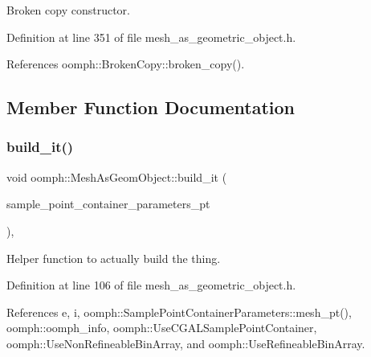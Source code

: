 Broken copy constructor. 



Definition at line 351 of file mesh\+\_\+as\+\_\+geometric\+\_\+object.\+h.



References oomph\+::\+Broken\+Copy\+::broken\+\_\+copy().



\subsection{Member Function Documentation}
\mbox{\label{classoomph_1_1MeshAsGeomObject_a1d0d14e9a1acf2b865df676fd354444f}} 
\subsubsection{\texorpdfstring{build\+\_\+it()}{build\_it()}}
{\footnotesize\ttfamily void oomph\+::\+Mesh\+As\+Geom\+Object\+::build\+\_\+it (\begin{DoxyParamCaption}\item[{\hyperlink{classoomph_1_1SamplePointContainerParameters}{Sample\+Point\+Container\+Parameters} $\ast$}]{sample\+\_\+point\+\_\+container\+\_\+parameters\+\_\+pt }\end{DoxyParamCaption})\hspace{0.3cm}{\ttfamily [inline]}, {\ttfamily [private]}}



Helper function to actually build the thing. 



Definition at line 106 of file mesh\+\_\+as\+\_\+geometric\+\_\+object.\+h.



References e, i, oomph\+::\+Sample\+Point\+Container\+Parameters\+::mesh\+\_\+pt(), oomph\+::oomph\+\_\+info, oomph\+::\+Use\+C\+G\+A\+L\+Sample\+Point\+Container, oomph\+::\+Use\+Non\+Refineable\+Bin\+Array, and oomph\+::\+Use\+Refineable\+Bin\+Array.

\mbox{\label{classoomph_1_1MeshAsGeomObject_aed3e9376f6042fed597098c0017a2131}} 
